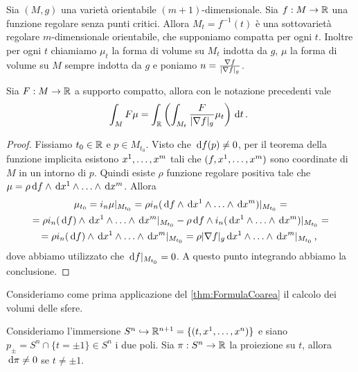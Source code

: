 Sia $(M,g)$ una varietà orientabile $(m+1)$-dimensionale. Sia $f:M \to \R$ una funzione regolare senza punti critici. Allora $M_t = f^{-1} (t)$ è una sottovarietà regolare $m$-dimensionale orientabile, che supponiamo compatta per ogni $t$.
Inoltre per ogni $t$ chiamiamo $\mu_t$ la forma di volume su $M_t$ indotta da $g$, $\mu$ la forma di volume su $M$ sempre indotta da $g$ e poniamo $n = \frac{\grad f}{\abs{\grad f}_g}$.

\begin{theorem}  \label{thm:FormulaCoarea} 
Sia $F:M \to \R$ a supporto compatto, allora con le notazione precedenti vale
\begin{equation*}
	\int_M F \mu = \int_\R \left( \int_{M_t} \frac F{\abs{\grad f}_g} \mu_t \right) \de t \punto
\end{equation*}
\end{theorem}

\begin{proof} %
	Fissiamo $t_0\in\R$ e $p\in M_{t_0}$. Visto che $\de f(p) \not = 0$, per il teorema della funzione implicita esistono $\seqa xm,$ tali che $(f, \seqa xm,)$ sono coordinate di $M$ in un intorno di $p$.
	Quindi esiste $\rho$ funzione regolare positiva tale che $\mu = \rho \de f \wedge \seqa {\de x}m\wedge$. Allora
	\begin{multline*}
		\mu_{t_0} = i_n \mu \restrict{M_{t_0}} = \rho i_n (\de f \wedge \seqa {\de x}m\wedge)\restrict{M_{t_0}} =\\
		= \rho i_n(\de f) \wedge \seqa {\de x}m\wedge \restrict{M_{t_0}} - \rho \de f \wedge i_n (\seqa {\de x}m\wedge)\restrict{M_{t_0}} =\\
		=\rho i_n(\de f) \wedge \seqa {\de x}m\wedge \restrict{M_{t_0}} =\rho \abs{\grad f}_g \seqa {\de x}m\wedge \restrict{M_{t_0}} \virgola
	\end{multline*}
	dove abbiamo utilizzato che $\de f\restrict {M_{t_0}} = 0$.
	A questo punto integrando abbiamo la conclusione.
\end{proof}

Consideriamo come prima applicazione del \cref{thm:FormulaCoarea} il calcolo dei volumi delle sfere.

Consideriamo l'immersione $S^n \hookrightarrow \R^{n+1} = \{(t,\seqa xn,)\}$ e siano $p_\pm = S^n\cap\{t=\pm 1\} \in S^n$ i due poli. Sia $\pi:S^n \to \R$ la proiezione su $t$, allora $\de \pi \not=0$ se $t\not=\pm 1$.

